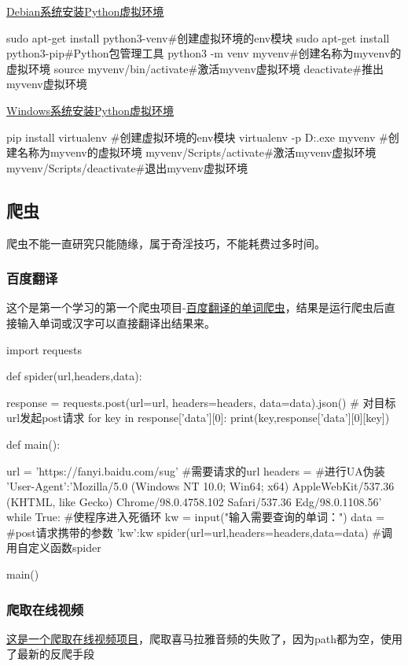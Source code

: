 \href{https://blog.csdn.net/qq_34444097/article/details/142733302?spm=1001.2014.3001.5506}{Debian系统安装Python虚拟环境}
\begin{shell}
sudo apt-get install python3-venv#创建虚拟环境的env模块
sudo apt-get install python3-pip#Python包管理工具
python3 -m venv myvenv#创建名称为myvenv的虚拟环境
source myvenv/bin/activate#激活myvenv虚拟环境
deactivate#推出myvenv虚拟环境
\end{shell}
\href{https://blog.csdn.net/cl_kleiber0802/article/details/142006096?spm=1001.2014.3001.5506}{Windows系统安装Python虚拟环境}
\begin{shell}
pip install virtualenv #创建虚拟环境的env模块
virtualenv -p D:\Python{}\Python.exe myvenv
#创建名称为myvenv的虚拟环境
myvenv/Scripts/activate#激活myvenv虚拟环境
myvenv/Scripts/deactivate#退出myvenv虚拟环境
\end{shell}
\subsection{爬虫}
爬虫不能一直研究只能随缘，属于奇淫技巧，不能耗费过多时间。
\subsubsection{百度翻译}
这个是第一个学习的第一个爬虫项目-\href{https://blog.csdn.net/m0_58378947/article/details/123905684?spm=1001.2014.3001.5506}{百度翻译的单词爬虫}，结果是运行爬虫后直接输入单词或汉字可以直接翻译出结果来。
\begin{shell}
import requests

def spider(url,headers,data):

    response = requests.post(url=url, headers=headers, data=data).json()  # 对目标url发起post请求
    for key in response['data'][0]:
        print(key,response['data'][0][key])

def main():

    url = 'https://fanyi.baidu.com/sug'  #需要请求的url
    headers = {  #进行UA伪装
        'User-Agent':'Mozilla/5.0 (Windows NT 10.0; Win64; x64) AppleWebKit/537.36 (KHTML, like Gecko) Chrome/98.0.4758.102 Safari/537.36 Edg/98.0.1108.56'
    }
    while True:  #使程序进入死循环
        kw = input("输入需要查询的单词：")
        data = {     #post请求携带的参数
            'kw':kw
        }
        spider(url=url,headers=headers,data=data)  #调用自定义函数spider

main()
\end{shell}
\subsubsection{爬取在线视频}
\href{https://blog.csdn.net/u011223449/article/details/136110053}{这是一个爬取在线视频项目}，爬取喜马拉雅音频的失败了，因为path都为空，使用了最新的反爬手段

